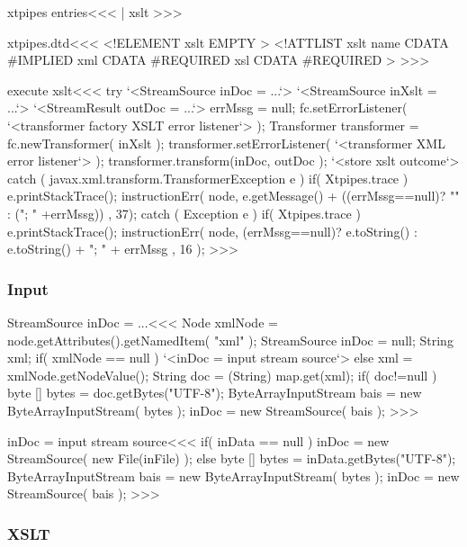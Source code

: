 \documentclass{article}
\begin{document}
{\<xtpipes entries\><<<
| xslt
>>>


\<xtpipes.dtd\><<<
<!ELEMENT xslt EMPTY >
<!ATTLIST xslt
          name CDATA #IMPLIED
          xml  CDATA #REQUIRED
          xsl  CDATA #REQUIRED
>
>>>

\<execute xslt\><<<
try{
   `<StreamSource inDoc = ...`>
   `<StreamSource inXslt = ...`>
   `<StreamResult outDoc = ...`>
   errMssg = null;
   fc.setErrorListener( `<transformer factory XSLT error listener`> );
   Transformer transformer = fc.newTransformer( inXslt );
   transformer.setErrorListener( `<transformer XML error listener`> );
   transformer.transform(inDoc, outDoc );
   `<store xslt outcome`>
} catch ( javax.xml.transform.TransformerException e ){
   if( Xtpipes.trace ){ e.printStackTrace(); }
   instructionErr( node,
                   e.getMessage()
                   +
                   ((errMssg==null)? "" : ("; " +errMssg))
                   , 37);
} catch ( Exception e ){
   if( Xtpipes.trace ){ e.printStackTrace(); }
   instructionErr( node, (errMssg==null)? e.toString()
                                        : e.toString() + "; " + errMssg
                       , 16 );
}
>>>







\subsubsection{Input}

\<StreamSource inDoc = ...\><<<
Node xmlNode = node.getAttributes().getNamedItem( "xml" );
StreamSource inDoc = null;
String xml;
if( xmlNode == null ){
   `<inDoc = input stream source`>
} else {
   xml = xmlNode.getNodeValue();
   String doc = (String) map.get(xml);
   if( doc!=null ){
      byte [] bytes = doc.getBytes("UTF-8");
      ByteArrayInputStream bais = new ByteArrayInputStream( bytes );
      inDoc = new StreamSource( bais );
}  }
>>>




\<inDoc = input stream source\><<<
if( inData == null ){
   inDoc = new StreamSource( new File(inFile) );
} else {
   byte [] bytes = inData.getBytes("UTF-8");
   ByteArrayInputStream bais = new ByteArrayInputStream( bytes );
   inDoc = new StreamSource( bais );
}
>>>



\subsubsection{XSLT}

}
\end{document}
